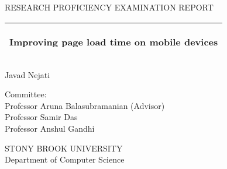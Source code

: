%
%
%
%
%
\begin{titlepage}
  \addtolength{\hoffset}{0.5\evensidemargin-0.5\oddsidemargin} %
  \noindent%
\begin{center}
    {\Large
          RESEARCH PROFICIENCY EXAMINATION REPORT
         }\\
    \vspace{0.2cm}
     \end{center}
   \vspace{4 cm}
   \begin{tabular}{@{}p{\textwidth}@{}}
    \toprule[2pt]
    \midrule
    \vspace{0.2cm}
    \begin{center}
    \Huge{\textbf{
      Improving page load time on mobile devices%
    }}
    \end{center}
    
    \vspace{0.2cm}\\
    \midrule
    \toprule[2pt]
  \end{tabular}
  
  \vspace{2 cm}
  \begin{center}
    {\Large
      Javad Nejati 
    }\\
    \end{center}
      \vspace{2 cm}

    
     \begin{flushright}
    {\Large
      Committee:
      }\\
Professor Aruna Balasubramanian (Advisor)\\
Professor Samir Das\\
Professor Anshul Gandhi\\
    \vspace{0.2cm}
     \end{flushright}
  \vspace{2 cm}

  \begin{center}
STONY BROOK UNIVERSITY\\
Department of Computer Science\\
  \end{center}
\end{titlepage}
\clearpage
